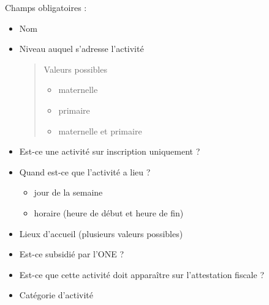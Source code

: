 \documentclass[letterpaper,10pt,english]{sphinxmanual}
\begin{document}
Champs obligatoires :
\begin{itemize}
\item {} 
Nom

\item {} 
Niveau auquel s'adresse l'activité
\begin{quote}

Valeurs possibles
\begin{itemize}
\item {} 
maternelle

\item {} 
primaire

\item {} 
maternelle et primaire

\end{itemize}
\end{quote}

\item {} 
Est-ce une activité sur inscription uniquement ?

\item {} 
Quand est-ce que l'activité a lieu ?
\begin{itemize}
\item {} 
jour de la semaine

\item {} 
horaire (heure de début et heure de fin)

\end{itemize}

\item {} 
Lieux d'accueil (plusieurs valeurs possibles)

\item {} 
Est-ce subsidié par l'ONE ?

\item {} 
Est-ce que cette activité doit apparaître sur l'attestation fiscale ?

\item {} 
Catégorie d'activité

\end{itemize}
\end{document}
